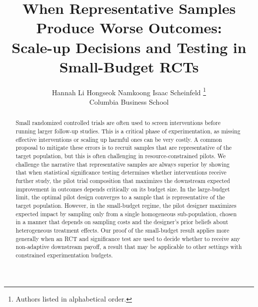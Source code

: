 \documentclass[11pt]{article}
\title{When Representative Samples Produce Worse Outcomes:\\Scale-up Decisions and Testing in Small-Budget RCTs}
\author{
  Hannah Li \quad Hongseok Namkoong \quad Isaac Scheinfeld \thanks{Authors listed in alphabetical order.} \\[0.3em]
  Columbia Business School
}
\date{}
\begin{document}
\maketitle
\vspace{-2em}

\begin{abstract}
  Small randomized controlled trials are often used to screen interventions before running larger follow-up studies.
  This is a critical phase of experimentation, as missing effective interventions or scaling up harmful ones can be very costly.
  A common proposal to mitigate these errors is to recruit samples that are representative of the target population, but this is often challenging in resource-constrained pilots.
  We challenge the narrative that representative samples are always superior by showing that when statistical significance testing determines whether interventions receive further study, the pilot trial composition that maximizes the downstream expected improvement in outcomes depends critically on its budget size.
  In the large-budget limit, the optimal pilot design converges to a sample that is representative of the target population.
  However, in the small-budget regime, the pilot designer maximizes expected impact by sampling only from a single homogeneous sub-population, chosen in a manner that depends on sampling costs and the designer's prior beliefs about heterogeneous treatment effects.
  Our proof of the small-budget result applies more generally when an RCT and significance test are used to decide whether to receive any non-adaptive downstream payoff, a result that may be applicable to other settings with constrained experimentation budgets.
\end{abstract}










\newpage
\appendix
\printappendixcontents





\stopappendixcontents

\printbibliography
\end{document}

